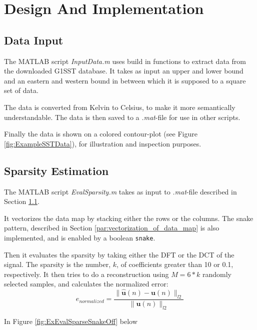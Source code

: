 \documentclass[Main]{subfiles}
\begin{document}
\section{Design And Implementation} %
\label{sec:design_and_implementation}

	\subsection{Data Input} %
	\label{sub:data_input}

		The MATLAB script \emph{InputData.m} uses build in functions to extract data from the downloaded G1SST database.
		It takes as input an upper and lower bound and an eastern and western bound in between which it is supposed to a square set of data.

		The data is converted from Kelvin to Celsius, to make it more semantically understandable.
		The data is then saved to a \emph{.mat}-file for use in other scripts.

		Finally the data is shown on a colored contour-plot (see Figure \ref{fig:ExampleSSTData}), for illustration and inspection purposes.

	

	\subsection{Sparsity Estimation} %
	\label{sub:sparsity_estimation}

		The MATLAB script \emph{EvalSparsity.m} takes as input to \emph{.mat}-file described in Section \ref{sub:data_input}.

		It vectorizes the data map by stacking either the rows or the columns.
		The snake pattern, described in Section \ref{par:vectorization_of_data_map} is also implemented, and is enabled by a boolean \texttt{snake}.

		Then it evaluates the sparsity by taking either the DFT or the DCT of the signal.
		The sparsity is the number, $k$, of coefficients greater than 10 or 0.1, respectively.
		It then tries to do a reconstruction using $M = 6*k$ randomly selected samples, and calculates the normalized error:
		\begin{equation}
			e_{normalized} = \frac
				{\|\mathbf{\hat{u}}(n) - \mathbf{u}(n)\|_{l2}}
				{\|\mathbf{u}(n)\|_{l2}}
		\end{equation}

		In Figure \ref{fig:ExEvalSparseSnakeOff} below
\end{document}
